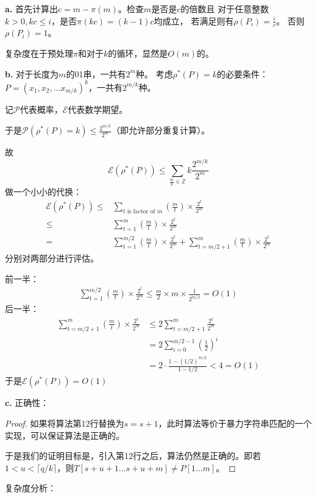 \begin{solution}
\textbf{a.}
首先计算出$c = m-\pi(m)$。检查$m$是否是$c$的倍数且
对于任意整数$k>0,kc\le i$，是否$\pi(kc) = (k-1)c$均成立，
若满足则有$\rho(P_i) = \frac{i}{c}$。
否则$\rho(P_i) = 1$。

复杂度在于预处理$\pi$和对于$k$的循环，显然是$O(m)$的。

\textbf{b.}
对于长度为$m$的01串，一共有$2^m$种。
考虑$\rho^*(P) = k$的必要条件：$P=(x_1,x_2,\ldots x_{m/k})^k$，一共有$2^{m/k}$种。 

记$\mathcal{P}$代表概率，$\mathcal{E}$代表数学期望。

于是$\mathcal{P}(\rho^*(P)=k) \le \frac{2^{m/k}}{2^m}$（即允许部分重复计算）。

故$$\mathcal{E}(\rho^*(P)) \le \sum_{\frac{m}{k} \in \mathbb{Z} } k\frac{2^{m/k}}{2^m} $$
做一个小小的代换：
\begin{align*}
    \mathcal{E}(\rho^*(P)) \le& \sum_{t \text{ is factor of } m} (\frac{m}{t})\times\frac{2^t}{2^m}\\
    \le& \sum_{t=1}^m (\frac{m}{t})\times\frac{2^t}{2^m}\\
    =& \sum_{t=1}^{m/2} (\frac{m}{t})\times\frac{2^t}{2^m}+\sum_{t=m/2+1}^{m} (\frac{m}{t})\times\frac{2^t}{2^m}
\end{align*}
分别对两部分进行评估。

前一半：
\begin{align*}
    \sum_{t=1}^{m/2} (\frac{m}{t})\times\frac{2^t}{2^m} \le \frac{m}{2}\times m\times\frac{1}{2^{m/2}} = O(1)
\end{align*}
后一半：
\begin{align*}
    \sum_{t=m/2+1}^{m} (\frac{m}{t})\times\frac{2^t}{2^m} &\le 2\sum_{t=m/2+1}^{m} \frac{2^t}{2^m} \\
    &= 2\sum_{i=0}^{m/2-1} (\frac{1}{2})^i\\
    &= 2\cdot \frac{1-(1/2)^{m/2}}{1-1/2} < 4 = O(1)
\end{align*}
于是$\mathcal{E}(\rho^*(P)) = O(1)$

\textbf{c.}
正确性：
\begin{proof}
    如果将算法第12行替换为$s=s+1$，此时算法等价于暴力字符串匹配的一个实现，可以保证算法是正确的。

    于是我们的证明目标是，引入第12行之后，算法仍然是正确的。即若$1<u<\lceil q / k\rceil$，则$T[s+u+1\ldots s+u+m]\neq P[1\ldots m]$。
\end{proof}
复杂度分析：

\end{solution}